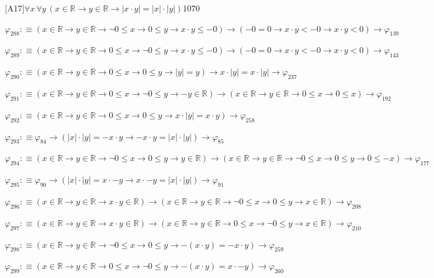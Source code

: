 \begin{fullproof}{[A17]}{$\forall x\,\forall y\,(x \in \mathbb{R} \to y \in \mathbb{R} \to \lvert x \cdot y \rvert = \lvert x \rvert \cdot \lvert y \rvert)$}{1070}
\begin{abbrevlist}
\item $\varphi_{288} :\equiv (x \in \mathbb{R} \to y \in \mathbb{R} \to \neg 0 \leq x \to 0 \leq y \to x \cdot y \leq -0) \to (-0 = 0 \to x \cdot y < -0 \to x \cdot y < 0) \to \varphi_{139}$
\item $\varphi_{289} :\equiv (x \in \mathbb{R} \to y \in \mathbb{R} \to 0 \leq x \to \neg 0 \leq y \to x \cdot y \leq -0) \to (-0 = 0 \to x \cdot y < -0 \to x \cdot y < 0) \to \varphi_{143}$
\item $\varphi_{290} :\equiv (x \in \mathbb{R} \to y \in \mathbb{R} \to 0 \leq x \to 0 \leq y \to \lvert y \rvert = y) \to x \cdot \lvert y \rvert = x \cdot \lvert y \rvert \to \varphi_{237}$
\item $\varphi_{291} :\equiv (x \in \mathbb{R} \to y \in \mathbb{R} \to 0 \leq x \to \neg 0 \leq y \to -y \in \mathbb{R}) \to (x \in \mathbb{R} \to y \in \mathbb{R} \to 0 \leq x \to 0 \leq x) \to \varphi_{192}$
\item $\varphi_{292} :\equiv (x \in \mathbb{R} \to y \in \mathbb{R} \to 0 \leq x \to 0 \leq y \to x \cdot \lvert y \rvert = x \cdot y) \to \varphi_{258}$
\item $\varphi_{293} :\equiv \varphi_{84} \to (\lvert x \rvert \cdot \lvert y \rvert = -x \cdot y \to -x \cdot y = \lvert x \rvert \cdot \lvert y \rvert) \to \varphi_{85}$
\item $\varphi_{294} :\equiv (x \in \mathbb{R} \to y \in \mathbb{R} \to \neg 0 \leq x \to 0 \leq y \to y \in \mathbb{R}) \to (x \in \mathbb{R} \to y \in \mathbb{R} \to \neg 0 \leq x \to 0 \leq y \to 0 \leq -x) \to \varphi_{177}$
\item $\varphi_{295} :\equiv \varphi_{90} \to (\lvert x \rvert \cdot \lvert y \rvert = x \cdot -y \to x \cdot -y = \lvert x \rvert \cdot \lvert y \rvert) \to \varphi_{91}$
\item $\varphi_{296} :\equiv (x \in \mathbb{R} \to y \in \mathbb{R} \to x \cdot y \in \mathbb{R}) \to (x \in \mathbb{R} \to y \in \mathbb{R} \to \neg 0 \leq x \to 0 \leq y \to x \in \mathbb{R}) \to \varphi_{208}$
\item $\varphi_{297} :\equiv (x \in \mathbb{R} \to y \in \mathbb{R} \to x \cdot y \in \mathbb{R}) \to (x \in \mathbb{R} \to y \in \mathbb{R} \to 0 \leq x \to \neg 0 \leq y \to x \in \mathbb{R}) \to \varphi_{210}$
\item $\varphi_{298} :\equiv (x \in \mathbb{R} \to y \in \mathbb{R} \to \neg 0 \leq x \to 0 \leq y \to -(x \cdot y) = -x \cdot y) \to \varphi_{259}$
\item $\varphi_{299} :\equiv (x \in \mathbb{R} \to y \in \mathbb{R} \to 0 \leq x \to \neg 0 \leq y \to -(x \cdot y) = x \cdot -y) \to \varphi_{260}$

\end{abbrevlist}
\end{fullproof}
